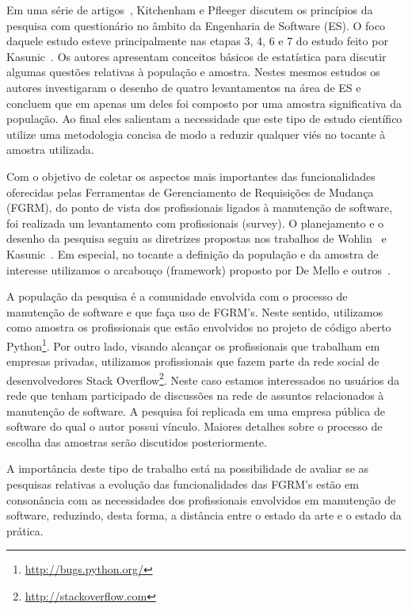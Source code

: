 Em uma série de artigos~\cite{pfleeger2001principles,pfleeger2002principles},
Kitchenham e Pfleeger discutem os princípios da pesquisa com questionário no
âmbito da Engenharia de Software (ES). O foco daquele estudo esteve
principalmente nas etapas 3, 4, 6 e 7 do estudo feito por
Kasunic~\cite{kasunic2005designing}. Os autores apresentam conceitos básicos de
estatística para discutir algumas questões relativas à população e amostra.
Nestes mesmos estudos os autores investigaram o desenho de quatro levantamentos
na área de ES e concluem que em apenas um deles foi composto por uma amostra
significativa da população. Ao final eles salientam a necessidade que este tipo
de estudo científico utilize uma metodologia concisa de modo a reduzir qualquer
viés no tocante à amostra utilizada.

Com o objetivo de coletar os aspectos mais importantes das funcionalidades
oferecidas pelas Ferramentas de Gerenciamento de Requisições de Mudança (FGRM),
do ponto de vista dos profissionais ligados à manutenção de software, foi
realizada um levantamento com profissionais (survey). O planejamento e o desenho
da pesquisa seguiu as diretrizes propostas nos trabalhos de
Wohlin~\cite{wohlin2012experimentation} e Kasunic~\cite{kasunic2005designing}.
Em especial, no tocante a definição da população e da amostra de interesse
utilizamos o arcabouço (framework) proposto por De Mello e
outros~\cite{de2015investigating, de2014towards}.

A população da pesquisa é a comunidade envolvida com o processo de manutenção de
software e que faça uso de FGRM's. Neste sentido, utilizamos  como amostra os
profissionais que estão envolvidos no projeto de código aberto
Python\footnote{\url{http://bugs.python.org/}}. Por outro lado, visando alcançar
os profissionais que trabalham em empresas privadas, utilizamos profissionais
que fazem parte da rede social de desenvolvedores Stack
Overflow\footnote{\url{http://stackoverflow.com}}. Neste caso estamos
interessados no usuários da rede que tenham participado de discussões na rede de
assuntos relacionados à manutenção de software. A pesquisa foi replicada em uma
empresa pública de software do qual o autor possui vínculo.  Maiores detalhes
sobre o processo de escolha das amostras serão discutidos posteriormente.

A importância deste tipo de trabalho está na possibilidade de avaliar se as
pesquisas relativas a evolução das funcionalidades das FGRM's estão em
consonância com as necessidades dos profissionais envolvidos em manutenção de
software, reduzindo, desta forma, a distância entre o estado da arte e o estado
da prática.


